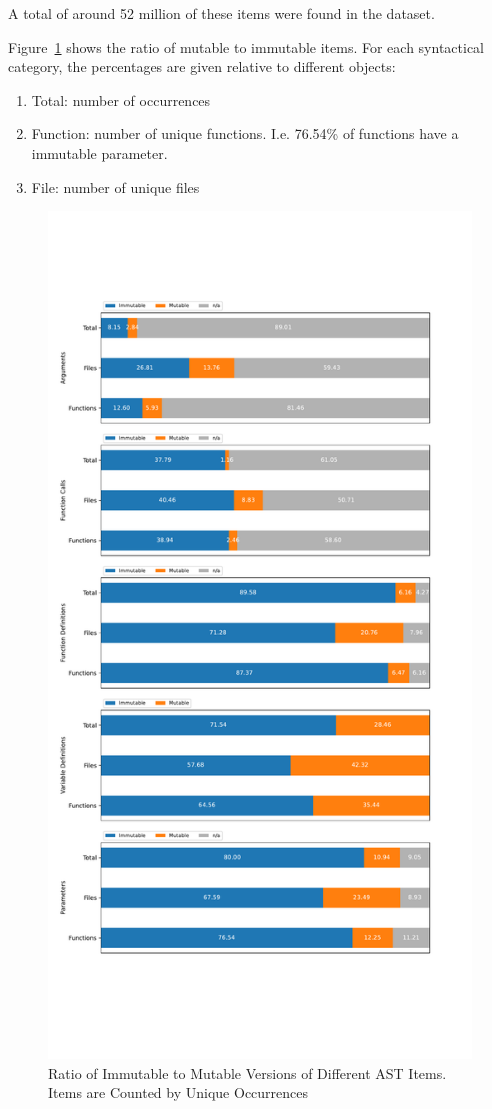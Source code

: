 \documentclass{book}
\theoremstyle{definition}
\begin{document}
A total of around 52 million of these items were found in the dataset.

Figure~\ref{fig:mutabillity_by_category} shows the ratio of mutable to immutable items. For each syntactical category, the percentages are given relative to different objects:

\begin{enumerate}
  \item Total: number of occurrences
  \item Function: number of unique functions. I.e. 76.54\% of functions have a immutable parameter.
  \item File: number of unique files
\end{enumerate}


\begin{figure}[h]
	\centering
	\includegraphics[width=0.9\linewidth, clip, trim={0.5cm 6cm 0.5cm 6cm}]{../mutability_by_category.pdf}
	\caption{Ratio of Immutable to Mutable Versions of Different AST Items. Items are Counted by Unique Occurrences}
	\label{fig:mutabillity_by_category}
\end{figure}
\end{document}
